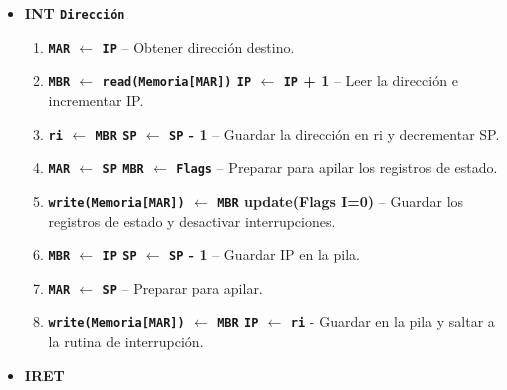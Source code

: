\documentclass[12pt,oneside]{templates/unerthesis}
\providecommand{\tightlist}{%
  \setlength{\itemsep}{0pt}\setlength{\parskip}{0pt}}
\begin{document}
\begin{itemize}
  \begin{itemize}
  \tightlist
  \item
    \textbf{INT \texttt{Dirección}}

    \begin{enumerate}
    \def\labelenumi{\arabic{enumi}.}
    \setcounter{enumi}{3}
    \tightlist
    \item
      \textbf{\texttt{MAR} \(\leftarrow\) \texttt{IP}} -- Obtener dirección destino.
    \item
      \textbf{\texttt{MBR} \(\leftarrow\) \texttt{read(Memoria{[}MAR{]})} \textbar{} \texttt{IP} \(\leftarrow\) \texttt{IP} + 1} -- Leer la dirección e incrementar IP.
    \item
      \textbf{\texttt{ri} \(\leftarrow\) \texttt{MBR} \textbar{} \texttt{SP} \(\leftarrow\) \texttt{SP} - 1} -- Guardar la dirección en ri y decrementar SP.
    \item
      \textbf{\texttt{MAR} \(\leftarrow\) \texttt{SP} \textbar{} \texttt{MBR} \(\leftarrow\) \texttt{Flags}} -- Preparar para apilar los registros de estado.
    \item
      \textbf{\texttt{write(Memoria{[}MAR{]})} \(\leftarrow\) \texttt{MBR} \textbar{} update(Flags I=0)} -- Guardar los registros de estado y desactivar interrupciones.
    \item
      \textbf{\texttt{MBR} \(\leftarrow\) \texttt{IP} \textbar{} \texttt{SP} \(\leftarrow\) \texttt{SP} - 1} -- Guardar IP en la pila.
    \item
      \textbf{\texttt{MAR} \(\leftarrow\) \texttt{SP}} -- Preparar para apilar.
    \item
      \textbf{\texttt{write(Memoria{[}MAR{]})} \(\leftarrow\) \texttt{MBR} \textbar{} \texttt{IP} \(\leftarrow\) \texttt{ri}} - Guardar en la pila y saltar a la rutina de interrupción.
    \end{enumerate}
  \item
    \textbf{IRET}


\end{itemize}
\end{itemize}
\end{document}
